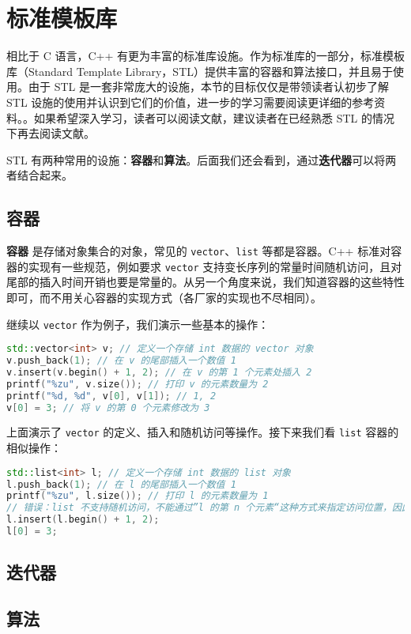 \section{标准模板库}

相比于 C 语言，C++ 有更为丰富的标准库设施。作为标准库的一部分，标准模板库（Standard Template Library，STL）提供丰富的容器和算法接口，并且易于使用。由于 STL 是一套非常庞大的设施，本节的目标仅仅是带领读者认初步了解 STL 设施的使用并认识到它们的价值，进一步的学习需要阅读更详细的参考资料。。如果希望深入学习，读者可以阅读文献\cite{Lippman2013C,StlRef2002,HouJie2002STL}，建议读者在已经熟悉 STL 的情况下再去阅读文献\cite{HouJie2002STL}。

STL 有两种常用的设施：\textbf{容器}和\textbf{算法}。后面我们还会看到，通过\textbf{迭代器}可以将两者结合起来。

\subsection{容器}

\textbf{容器} 是存储对象集合的对象，常见的 \texttt{vector}、\texttt{list} 等都是容器。C++ 标准对容器的实现有一些规范，例如要求 \texttt{vector} 支持变长序列的常量时间随机访问，且对尾部的插入时间开销也要是常量的。从另一个角度来说，我们知道容器的这些特性即可，而不用关心容器的实现方式（各厂家的实现也不尽相同）。

继续以 \texttt{vector} 作为例子，我们演示一些基本的操作：
\begin{lstlisting}[language=c++]
std::vector<int> v; // 定义一个存储 int 数据的 vector 对象
v.push_back(1); // 在 v 的尾部插入一个数值 1
v.insert(v.begin() + 1, 2); // 在 v 的第 1 个元素处插入 2
printf("%zu", v.size()); // 打印 v 的元素数量为 2
printf("%d, %d", v[0], v[1]); // 1, 2
v[0] = 3; // 将 v 的第 0 个元素修改为 3
\end{lstlisting}
上面演示了 \texttt{vector} 的定义、插入和随机访问等操作。接下来我们看 \texttt{list} 容器的相似操作：
\begin{lstlisting}[language=c++]
std::list<int> l; // 定义一个存储 int 数据的 list 对象
l.push_back(1); // 在 l 的尾部插入一个数值 1
printf("%zu", l.size()); // 打印 l 的元素数量为 1
// 错误：list 不支持随机访问，不能通过”l 的第 n 个元素“这种方式来指定访问位置，因此不支持下标访问
l.insert(l.begin() + 1, 2);
l[0] = 3;
\end{lstlisting}

\subsection{迭代器}

\subsection{算法}
